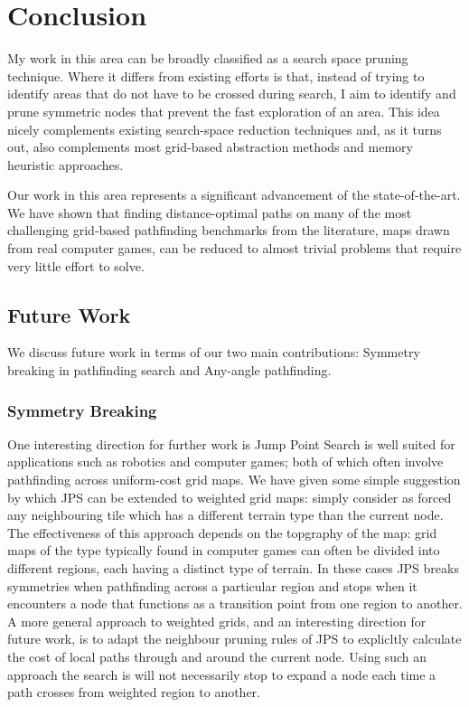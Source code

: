 \chapter{Conclusion}
\label{cha::conclusion}
My work in this area can be broadly classified as a search space pruning
technique. Where it differs from existing efforts is that, instead of trying to
identify areas that do not have to be crossed during search, I aim to identify
and prune symmetric nodes that prevent the fast exploration of an area. This
idea nicely complements existing search-space reduction techniques and, as it
turns out, also complements most grid-based abstraction methods and memory
heuristic approaches.

Our work in this area represents a significant advancement of the state-of-the-art.
We have shown that finding distance-optimal paths on many of the most challenging 
grid-based pathfinding benchmarks from the literature, maps drawn from real computer games,
can be reduced to almost trivial problems that require very little effort to solve.

\section{Future Work}
We discuss future work in terms of our two main contributions: Symmetry breaking
in pathfinding search and Any-angle pathfinding.

\subsection{Symmetry Breaking}
One interesting direction for further work is Jump Point Search is well suited
for applications such as robotics and computer games; both of which often
involve pathfinding across uniform-cost grid maps.  We have given some simple
suggestion by which JPS can be extended to weighted grid maps: simply consider
as forced any neighbouring tile which has a different terrain type than the
current node. The effectiveness of this approach depends on the topgraphy of
the map: grid maps of the type typically found in computer games can often be
divided into different regions, each having a distinct type of terrain. In
these cases JPS breaks symmetries when pathfinding across a particular region
and stops when it encounters a node that functions as a transition point from
one region to another. A more general approach to weighted grids, and an
interesting direction for future work, is to adapt the neighbour pruning rules
of JPS to explicltly calculate the cost of local paths through and around the
current node.  Using such an approach the search is will not necessarily stop
to expand a node each time a path crosses from weighted region to another.

